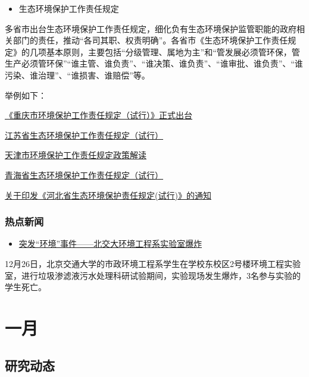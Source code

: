\documentclass[
]{book}
\providecommand{\tightlist}{%
  \setlength{\itemsep}{0pt}\setlength{\parskip}{0pt}}
\begin{document}
\begin{itemize}
\tightlist
\item
  生态环境保护工作责任规定
\end{itemize}

多省市出台生态环境保护工作责任规定，细化负有生态环境保护监管职能的政府相关部门的责任，推动``各司其职、权责明确''。各省市《生态环境保护工作责任规定》的几项基本原则，主要包括``分级管理、属地为主''和``管发展必须管环保，管生产必须管环保''``谁主管、谁负责''、``谁决策、谁负责''、``谁审批、谁负责''、``谁污染、谁治理''、``谁损害、谁赔偿''等。

举例如下：

\href{http://www.cepb.gov.cn/doc/2016/11/25/148053.shtml}{《重庆市环境保护工作责任规定（试行）》正式出台}

\href{http://jsnews2.jschina.com.cn/system/2016/12/26/030319286.shtml}{江苏省生态环境保护工作责任规定（试行）}

\href{http://www.tj.gov.cn/zw/zcjd/201706/t20170630_3605048.html}{天津市环境保护工作责任规定政策解读}

\href{http://www.qh.gov.cn/zwgk/system/2017/07/20/010273792.shtml}{青海省生态环境保护工作责任规定（试行）}

\href{http://www.hebhb.gov.cn/xwzx/szfwj/201709/t20170920_56450.html}{关于印发《河北省生态环境保护责任规定(试行)》的通知}

\hypertarget{ux70edux70b9ux65b0ux95fb-1}{%
\subsubsection*{热点新闻}\label{ux70edux70b9ux65b0ux95fb-1}}

\begin{itemize}
\tightlist
\item
  \href{http://www.njtu.edu.cn/tzgg/159991.htm}{突发``环境''事件------北交大环境工程系实验室爆炸}
\end{itemize}

12月26日，北京交通大学的市政环境工程系学生在学校东校区2号楼环境工程实验室，进行垃圾渗滤液污水处理科研试验期间，实验现场发生爆炸，3名参与实验的学生死亡。

\hypertarget{ux4e00ux6708-1}{%
\section*{一月}\label{ux4e00ux6708-1}}

\hypertarget{ux7814ux7a76ux52a8ux6001-14}{%
\subsection*{研究动态}\label{ux7814ux7a76ux52a8ux6001-14}}
\end{document}
